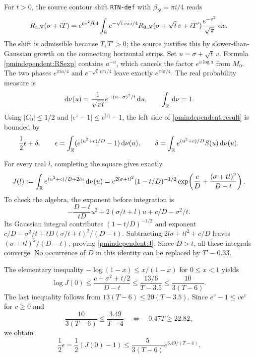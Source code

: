 \documentclass[11pt]{article}
\begin{document}
For $t>0$, the source contour shift \texttt{RTN-def} with
$\beta_N=\pi i/4$ reads
\[
 R_{t,N}(\sigma+iT)=e^{t\pi^2/64}
 \int_\mathbb R e^{-\sqrt t\,v\pi i/4}
 R_{0,N}(\sigma+\sqrt t\,v+iT')
                         \frac{e^{-v^2}}{\sqrt\pi}\,\mathrm d v.
\]
The shift is admissible because $T,T'>0$; the source justifies
this by slower-than-Gaussian growth on the connecting horizontal
strips. Set $u=\sigma+\sqrt t\,v$. Formula \eqref{pmindependent:RSexp} contains
$a^{-u}$, which cancels the factor $e^{u\log a}$ from $M_0$.
The two phases $e^{\pi iu/4}$ and $e^{-\sqrt t\,v\pi i/4}$
leave exactly $e^{\pi i\sigma/4}$. The real probability measure is
\[
 \,\mathrm d\nu(u)=\frac1{\sqrt{\pi t}}e^{-(u-\sigma)^2/t}\,\mathrm d u,
 \qquad \int_\mathbb R\,\mathrm d\nu=1.
\]
Using $|C_0|\le1/2$ and $|e^z-1|\le e^{|z|}-1$, the left
side of \eqref{pmindependent:result} is bounded by
\begin{equation}\label{pmindependent:epsdelta}
 \frac12\epsilon+\delta,\qquad
 \epsilon=\int_\mathbb R(e^{(u^2+c)/D}-1)\,\mathrm d\nu(u),\qquad
 \delta=\int_\mathbb R e^{(u^2+c)/D}S(u)\,\mathrm d\nu(u).
\end{equation}

For every real $l$, completing the square gives exactly
\begin{equation}\label{pmindependent:J}
 J(l):=\int_\mathbb R e^{(u^2+c)/D+2lu}\,\mathrm d\nu(u)
 =e^{2l\sigma+tl^2}(1-t/D)^{-1/2}
       \exp\!\left(\frac cD+\frac{(\sigma+tl)^2}{D-t}\right).
\end{equation}
To check the algebra, the exponent before integration is
\[
 -\frac{D-t}{tD}u^2+2(\sigma/t+l)u+c/D-\sigma^2/t.
\]
Its Gaussian integral contributes $(1-t/D)^{-1/2}$ and exponent
$c/D-\sigma^2/t+tD(\sigma/t+l)^2/(D-t)$.
Subtracting $2l\sigma+tl^2+c/D$ leaves
$(\sigma+tl)^2/(D-t)$, proving \eqref{pmindependent:J}. Since $D>t$,
all these integrals converge. No occurrence of $D$ in this identity
can be replaced by $T'-0.33$.

The elementary inequality $-\log(1-x)\le x/(1-x)$ for
$0\le x<1$ yields
\[
 \log J(0)\le\frac{c+\sigma^2+t/2}{D-t}
 \le\frac{13/6}{T-3.5}\le\frac{10}{3(T-6)}.
\]
The last inequality follows from $13(T-6)\le20(T-3.5)$.
Since $e^v-1\le ve^v$ for $v\ge0$ and
\[
 \frac{10}{3(T-6)}\le\frac{3.49}{T-4}
 \quad\Longleftrightarrow\quad 0.47T\ge22.82,
\]
we obtain
\begin{equation}\label{pmindependent:epsilonfinal}
 \frac12\epsilon=\frac12(J(0)-1)
       \le\frac5{3(T-6)}e^{3.49/(T-4)}.
\end{equation}
\end{document}
